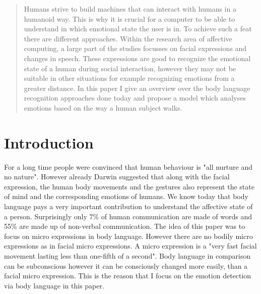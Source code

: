 \documentclass[conference]{IEEEtran}
\begin{document}
\begin{abstract}
Humans strive to build machines that can interact with humans in a humanoid way. This is why it is crucial for a computer to be able to understand in which emotional state the user is in. To achieve such a feat there are different approaches.
Within the research area of affective computing, a large part of the studies focusses on facial expressions and changes in speech. These expressions are good to recognize the emotional state of a human during social interaction, however they may not be suitable  in other situations for example recognizing emotions from a greater distance\cite{karg2012pattern}.
In this paper I give an overview over the body language recognition approaches done today and propose a model which analyses emotions based on the way a human subject walks.

\end{abstract}





%
\IEEEpeerreviewmaketitle



\section{Introduction}
For a long time people were convinced that human behaviour is "all nurture and no nature"\cite{eckman2003emotions}. However already Darwin\cite{darwin} suggested that along with the facial expression, the human body movements and the gestures also represent the state of mind and the corresponding emotions of humans. We know today that body language pays a very important contribution to understand the affective state of a person\cite{ekman1967head,mccoll2012affect}. Surprisingly only 7\% of human communication are made of words and 55\% are made up of non-verbal communication\cite{eckman2003emotions,singhsignificance,mehrabian1969significance}. 
The idea of this paper was to focus on micro expressions in body language. However there are no bodily micro expressions as in facial micro expressions. A micro expression is a "very fast facial movement lasting less than one-fifth of a second"\cite{eckman2003emotions}. Body language in comparison can be subconscious however it can be consciously changed more easily, than a facial micro expression. This is the reason that I focus on the emotion detection via body language in this paper.
\end{document}
